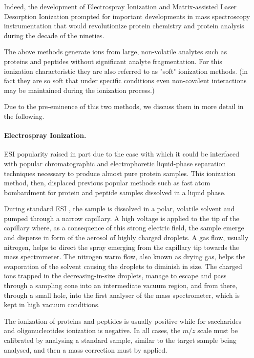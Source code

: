 Indeed, the development of Electrospray
Ionization \cite{fenn1989,dewald1999} and Matrix-assisted Laser Desorption Ionization
\cite{hillenkamp1991} prompted for important developments in mass spectroscopy
instrumentation that would revolutionize protein chemistry and protein analysis
during the decade of the nineties.

The above methods generate ions from large, non-volatile analytes such as proteins and
peptides without significant analyte fragmentation.
For this ionization characteristic they are also referred to as "soft" ionization methods.
(in fact they are so soft that under specific conditions
even non-covalent interactions may be maintained
during the ionization process.)

Due to the pre-eminence of this two methods, we discuss them in more detail in the following.


\paragraph{Electrospray Ionization.}
ESI popularity raised in part due to the ease with which it could
be interfaced with popular chromatographic and
electrophoretic liquid-phase separation techniques necessary to produce almost
pure protein samples.
This ionization method, then, displaced previous popular methods 
such as fast atom bombardment for protein and
peptide samples dissolved in a liquid phase.

During standard ESI \cite{fenn1984electrospray}, 
the sample is dissolved in a polar, volatile solvent and pumped through a narrow
capillary. 
A high voltage 
is applied to the tip of the capillary where, as a consequence of
this strong electric field, the sample emerge and disperse in form of the
aerosol of highly charged droplets.
A gas flow, usually nitrogen, helps to direct the spray emerging from the capillary tip towards the
mass spectrometer. 
The nitrogen warm flow, also known as drying gas, helps the evaporation of the
solvent causing the droplets to diminish in size. 
The charged ions trapped in the decreasing-in-size droplets, manage to escape
and pass through a sampling cone into an intermediate vacuum region, and from
there, through a small hole, into the first analyser of the mass spectrometer, which
is kept in  high vacuum conditions.

The ionization of proteins and peptides is usually positive while
for saccharides and oligonucleotides ionization is negative.
In all
cases, the $m/z$ scale must be calibrated by analysing a standard sample,
similar to the target sample being analysed, and then a mass correction must by
applied.

